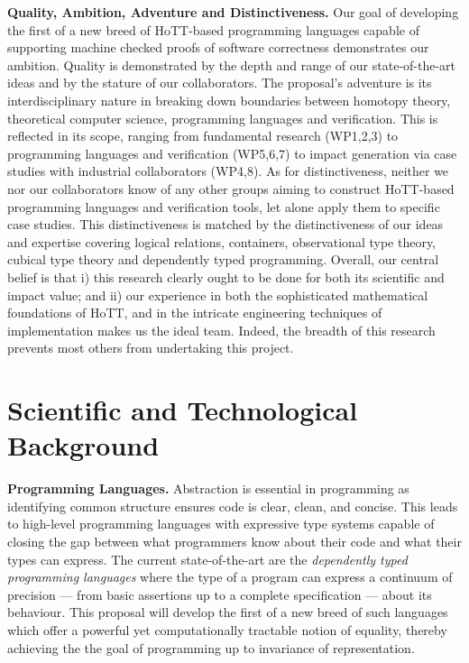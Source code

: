 \documentclass[a4paper,11pt]{article}
\begin{document}
  {\bf Quality, Ambition, Adventure and Distinctiveness.} Our goal of
  developing the first of a new breed of HoTT-based programming
  languages capable of supporting machine checked proofs of software
  correctness demonstrates our ambition. Quality is demonstrated by
  the depth and range of our state-of-the-art ideas and by the stature
  of our collaborators. The proposal's adventure is its
  interdisciplinary nature in breaking down boundaries between
  homotopy theory, theoretical computer science, programming languages
  and verification. This is reflected in its scope, ranging from
  fundamental research (WP1,2,3) to programming languages and
  verification (WP5,6,7) to impact generation via case studies with
  industrial collaborators (WP4,8). As for distinctiveness, neither we
  nor our collaborators know of any other groups aiming to construct
  HoTT-based programming languages and verification tools, let alone
  apply them to specific case studies. This distinctiveness is matched
  by the distinctiveness of our ideas and expertise covering logical
  relations, containers, observational type theory, cubical type
  theory and dependently typed programming.  Overall, our central
  belief is that i) this research clearly ought to be done for both
  its scientific and impact value; and ii) our experience in both the
  sophisticated mathematical foundations of HoTT, and in the intricate
  engineering techniques of implementation makes us the ideal team.
  Indeed, the breadth of this research prevents most others from
  undertaking this project.

\vspace*{-0.1in} 
\vspace*{-0.1in} 
\section{Scientific and Technological Background}
\vspace*{-0.1in} 

{\bf Programming Languages.} Abstraction is essential in programming
as identifying common structure ensures code is clear, clean, and
concise. This leads to high-level programming languages with
expressive type systems capable of closing the gap between what
programmers know about their code and what their types can express.
The current state-of-the-art are the {\em dependently typed
  programming languages} where the type of a program can express a
continuum of precision --- from basic assertions up to a complete
specification --- about its behaviour. This proposal will develop the
first of a new breed of such languages which offer a powerful yet
computationally tractable notion of equality, thereby achieving the
the goal of programming up to invariance of representation.
\end{document}
